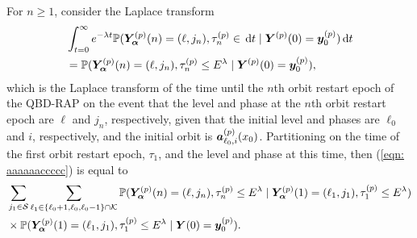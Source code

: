 
For \(n\geq 1\), consider the Laplace transform 
\begin{align}
	&\int_{t=0}^\infty e^{-\lambda t} \mathbb P(\bm{Y}_{\bm{\alpha}}^{(p)}(n) = (\ell, j_n), \tau_{n}^{(p)}\in \, \mathrm{d} t
	 \mid \boldsymbol Y^{(p)}(0)=\boldsymbol y_0^{(p)}) \, \mathrm{d} t \nonumber 
	 \\&=\mathbb P(\bm{Y}_{\bm{\alpha}}^{(p)}(n) = (\ell, j_n), \tau_{n}^{(p)}\leq E^{\lambda}
	 \mid \boldsymbol Y^{(p)}(0)=\boldsymbol y_0^{(p)}),\label{eqn: aaaaaaccccc} 
\end{align}
which is the Laplace transform of the time until the \(n\)th orbit restart epoch of the QBD-RAP on the event that the level and phase at the \(n\)th orbit restart epoch are \(\ell\) and \(j_n\), respectively, given that the initial level and phases are \(\ell_0\) and \(i\), respectively, and the initial orbit is \(\boldsymbol a_{\ell_0,i}^{(p)}(x_0)\). Partitioning on the time of the first orbit restart epoch, \(\tau_1\), and the level and phase at this time, then (\ref{eqn: aaaaaaccccc}) is equal to 
\begin{align}
	&\sum_{j_1\in\mathcal S}\sum_{\ell_1\in\{\ell_0+1,\ell_0,\ell_0-1\}\cap \mathcal K}\mathbb P(\bm{Y}_{\bm{\alpha}}^{(p)}(n) = (\ell, j_n), \tau_{n}^{(p)}\leq E^\lambda 
	 \mid \bm{Y}_{\bm{\alpha}}^{(p)}(1)=(\ell_1, j_1), \tau_1^{(p)}\leq E^\lambda ) \nonumber
	 \\&\times \mathbb P(\bm{Y}_{\bm{\alpha}}^{(p)}(1)=(\ell_1, j_1), \tau_{1}^{(p)}\leq E^\lambda
	 \mid \boldsymbol Y(0)=\boldsymbol y_0^{(p)}).
	 \label{eqn: mnebrb2}
\end{align}

